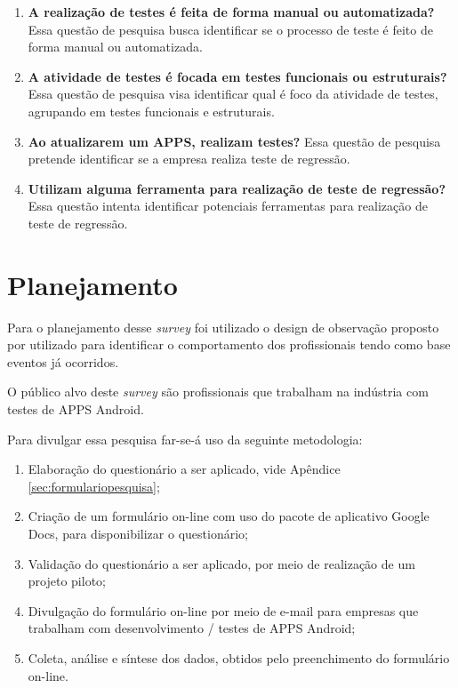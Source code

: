 \begin{enumerate}[label=\bf QP\arabic*,leftmargin=1.8cm]
    
    \item \textbf{A realização de testes é feita de forma manual ou automatizada?} Essa questão de pesquisa busca identificar se o processo de teste é feito de forma manual ou automatizada.
    
    \item \textbf{A atividade de testes é focada em testes funcionais ou estruturais?} Essa questão de pesquisa visa identificar qual é foco da atividade de testes, agrupando em testes funcionais e estruturais.
    
    \item \textbf{Ao atualizarem um \ac{APPS}, realizam testes?} Essa questão de pesquisa pretende identificar se a empresa realiza teste de regressão.
    
    \item \textbf{Utilizam alguma ferramenta para realização de teste de regressão?} Essa questão intenta identificar potenciais ferramentas para realização de teste de regressão.
    
    
\end{enumerate}



\section{Planejamento}

Para o planejamento desse \textit{survey} foi utilizado o design de observação proposto por \cite{Kitchenham:2002:PSR:566493.566495} utilizado para identificar o comportamento dos profissionais tendo como base eventos já ocorridos.


O público alvo deste \textit{survey} são profissionais que trabalham na indústria com testes de \ac{APPS} Android.


Para divulgar essa pesquisa far-se-á uso da seguinte metodologia:

\begin{enumerate}
    \item Elaboração do questionário a ser aplicado, vide Apêndice \ref{sec:formulariopesquisa};
    \item Criação de um formulário on-line com uso do pacote de aplicativo Google Docs, para disponibilizar o questionário;
    \item Validação do questionário a ser aplicado, por meio de realização de um projeto piloto;
    \item Divulgação do formulário on-line por meio de e-mail para empresas que trabalham com desenvolvimento / testes de \ac{APPS} Android;
    \item Coleta, análise e síntese dos dados, obtidos pelo preenchimento do formulário on-line.
\end{enumerate}


